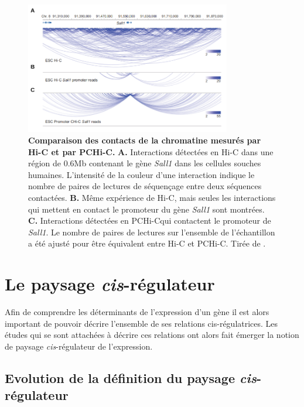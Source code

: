 \begin{figure}[h]
 \centering
 \includegraphics[width=0.8\textwidth, page=1] {figures/introduction/fig19.png}
 \caption[Comparaison des contacts de la chromatine mesurés par \acrshort{Hi-C} et par \acrshort{PCHi-C}.]{
 \textbf{Comparaison des contacts de la chromatine mesurés par \acrshort{Hi-C} et par \acrshort{PCHi-C}.}
 \textbf{A.} Interactions détectées en \acrshort{Hi-C} dans une région de 0.6Mb contenant le gène \textit{Sall1} dans les cellules souches humaines. L'intensité de la couleur d'une interaction indique le nombre de paires de lectures de séquençage entre deux séquences contactées. \textbf{B.} Même expérience de \acrshort{Hi-C}, mais seules les interactions qui mettent en contact le promoteur du gène \textit{Sall1} sont montrées. \textbf{C.} Interactions détectées en \acrshort{PCHi-C}qui contactent le promoteur de \textit{Sall1}. Le nombre de paires de lectures sur l'ensemble de l'échantillon a été ajusté pour être équivalent entre \acrshort{Hi-C} et \acrshort{PCHi-C}. Tirée de \citet{schoenfelder_pluripotent_2015}.\\
 }
 \label{fig:Fig19}
\end{figure}


\section{Le paysage \textit{cis}-régulateur}
\label{sec:paysage-cis-regul}

Afin de comprendre les déterminants de l'expression d'un gène il est alors important de pouvoir décrire l'ensemble de ses relations \gls{cis}-régulatrices. Les études qui se sont attachées à décrire ces relations ont alors fait émerger la notion de paysage \textit{cis}-régulateur de l'expression.

\subsection{Evolution de la définition du paysage \textit{cis}-régulateur}
\label{subsec:evol-def}

